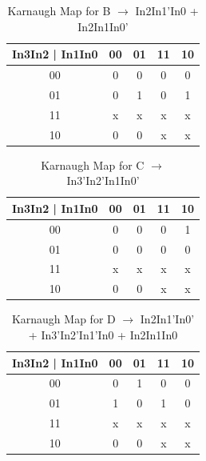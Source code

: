 \documentclass[
	letterpaper, %
	10pt, %
]{CSUniSchoolLabReport}
\begin{document}
    \begin{table}[H]
      \centering
      \begin{tabular}{|c | c | c | c | c |}
        \hline
        In3In2 |  In1In0 & 00 & 01 & 11 & 10\\
        \hline
        00 & 0 & 0 & 0 & 0\\
        \hline
        01 & 0 & 1 & 0 & 1\\
        \hline
        11 & x & x & x & x\\
        \hline
        10 & 0 & 0 & x & x\\
        \hline
      \end{tabular}
      \caption{Karnaugh Map for B $\rightarrow$ In2In1'In0 + In2In1In0'}
      \label{tab:3}
    \end{table}

    \begin{table}[H]
      \centering
      \begin{tabular}{|c | c | c | c | c |}
        \hline
        In3In2 |  In1In0 & 00 & 01 & 11 & 10\\
        \hline
        00 & 0 & 0 & 0 & 1\\
        \hline
        01 & 0 & 0 & 0 & 0\\
        \hline
        11 & x & x & x & x\\
        \hline
        10 & 0 & 0 & x & x\\
        \hline
      \end{tabular}
      \caption{Karnaugh Map for C $\rightarrow$ In3'In2'In1In0'}
      \label{tab:4}
    \end{table}

    \begin{table}[H]
      \centering
      \begin{tabular}{|c | c | c | c | c |}
        \hline
        In3In2 |  In1In0 & 00 & 01 & 11 & 10\\
        \hline
        00 & 0 & 1 & 0 & 0\\
        \hline
        01 & 1 & 0 & 1 & 0\\
        \hline
        11 & x & x & x & x\\
        \hline
        10 & 0 & 0 & x & x\\
        \hline
      \end{tabular}
      \caption{Karnaugh Map for D $\rightarrow$ In2In1'In0' + In3'In2'In1'In0 + In2In1In0}
      \label{tab:5}
    \end{table}
\end{document}
